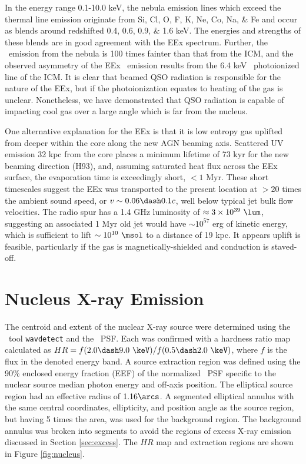 \documentclass[useAMS,usenatbib]{mn2e}
\begin{document}
In the energy range 0.1-10.0 keV, the nebula emission lines which
exceed the thermal line emission originate from Si, Cl, O, F, K, Ne,
Co, Na, \& Fe and occur as blends around redshifted 0.4, 0.6, 0.9, \&
1.6 keV. The energies and strengths of these blends are in good
agreement with the EEx spectrum. Further, the \feka\ emission from the
nebula is 100 times fainter than that from the ICM, and the observed
asymmetry of the EEx \feka\ emission results from the 6.4 keV
\feka\ photoionized line of the ICM. It is clear that beamed QSO
radiation is responsible for the nature of the EEx, but if the
photoionization equates to heating of the gas is unclear. Nonetheless,
we have demonstrated that QSO radiation is capable of impacting cool
gas over a large angle which is far from the nucleus.

One alternative explanation for the EEx is that it is low entropy gas
uplifted from deeper within the core along the new AGN beaming
axis. Scattered UV emission 32 kpc from the core places a minimum
lifetime of 73 kyr for the new beaming direction (H93), and, assuming
saturated heat flux across the EEx surface, the evaporation time is
exceedingly short, $< 1$ Myr. These short timescales suggest the EEx
was transported to the present location at $> 20$ times the ambient
sound speed, or $v \sim 0.06 \dash 0.1c$, well below typical jet bulk
flow velocities. The radio spur has a 1.4 GHz luminosity of $\approx 3
\times 10^{39} ~\lum$, suggesting an associated 1 Myr old jet would
have $\sim 10^{57}$ erg of kinetic energy, which is sufficient to lift
$\sim 10^{10} ~\msol$ to a distance of 19 kpc. It appears uplift is
feasible, particularly if the gas is magnetically-shielded and
conduction is staved-off.

\section{Nucleus X-ray Emission}
\label{sec:centsrc}

The centroid and extent of the nuclear X-ray source were determined
using the \ciao\ tool {\tt wavdetect} and the \chandra\ PSF. Each was
confirmed with a hardness ratio map calculated as $HR = f(2.0 \dash
9.0 ~\keV) / f(0.5 \dash 2.0 ~\keV)$, where $f$ is the flux in the
denoted energy band. A source extraction region was defined using the
90\% enclosed energy fraction (EEF) of the normalized \chandra\ PSF
specific to the nuclear source median photon energy and off-axis
position. The elliptical source region had an effective radius of
$1.16\arcs$. A segmented elliptical annulus with the same central
coordinates, ellipticity, and position angle as the source region, but
having 5 times the area, was used for the background region. The
background annulus was broken into segments to avoid the regions of
excess X-ray emission discussed in Section \ref{sec:excess}. The $HR$
map and extraction regions are shown in Figure \ref{fig:nucleus}.
\end{document}
